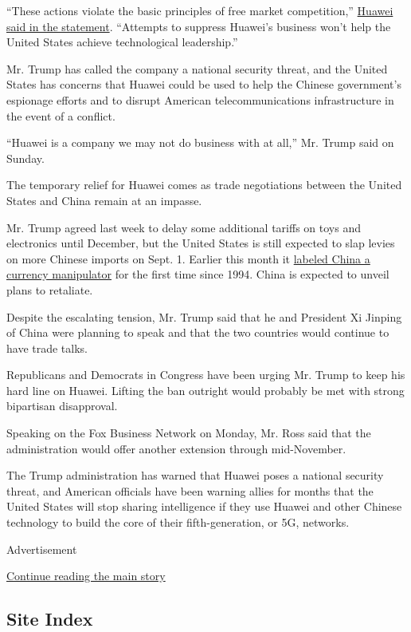 ``These actions violate the basic principles of free market
competition,''
\href{https://www.huawei.eu/press-release/media-statement-regarding-us-commerce-departments-decision-extend-temporary-general}{Huawei
said in the statement}. ``Attempts to suppress Huawei's business won't
help the United States achieve technological leadership.''

Mr. Trump has called the company a national security threat, and the
United States has concerns that Huawei could be used to help the Chinese
government's espionage efforts and to disrupt American
telecommunications infrastructure in the event of a conflict.

``Huawei is a company we may not do business with at all,'' Mr. Trump
said on Sunday.

The temporary relief for Huawei comes as trade negotiations between the
United States and China remain at an impasse.

Mr. Trump agreed last week to delay some additional tariffs on toys and
electronics until December, but the United States is still expected to
slap levies on more Chinese imports on Sept. 1. Earlier this month it
\href{https://www.nytimes.com/2019/08/06/business/economy/china-currency-manipulator.html}{labeled
China a currency manipulator} for the first time since 1994. China is
expected to unveil plans to retaliate.

Despite the escalating tension, Mr. Trump said that he and President Xi
Jinping of China were planning to speak and that the two countries would
continue to have trade talks.

Republicans and Democrats in Congress have been urging Mr. Trump to keep
his hard line on Huawei. Lifting the ban outright would probably be met
with strong bipartisan disapproval.

Speaking on the Fox Business Network on Monday, Mr. Ross said that the
administration would offer another extension through mid-November.

The Trump administration has warned that Huawei poses a national
security threat, and American officials have been warning allies for
months that the United States will stop sharing intelligence if they use
Huawei and other Chinese technology to build the core of their
fifth-generation, or 5G, networks.

Advertisement

\protect\hyperlink{after-bottom}{Continue reading the main story}

\hypertarget{site-index}{%
\subsection{Site Index}\label{site-index}}

